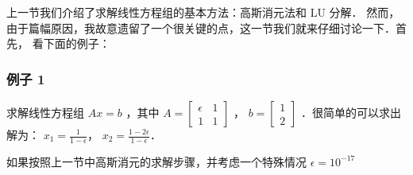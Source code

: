 
\begin{issues}
\issueDraft
\end{issues}


上一节我们介绍了求解线性方程组的基本方法：高斯消元法和 LU 分解． 然而，由于篇幅原因，我故意遗留了一个很关键的点，这一节我们就来仔细讨论一下．首先， 看下面的例子：

\subsubsection{例子 1}

求解线性方程组  $Ax=b$  ，其中  $A=\begin{bmatrix} \epsilon & 1\\ 1 & 1 \end{bmatrix}$  ，  $b=\begin{bmatrix}  1\\  2 \end{bmatrix}$  ．很简单的可以求出解为：  $x_1=\frac{1}{1-\epsilon}$， $x_2=\frac{1-2\epsilon}{1-\epsilon}$．

如果按照上一节中高斯消元的求解步骤，并考虑一个特殊情况  $\epsilon=10^{-17}$  

